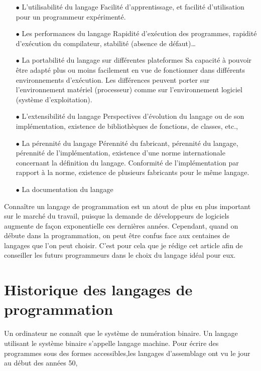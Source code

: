 \documentclass[a4paper,12pt]{article} %
\begin{document}
\begin{itemize}
\item[$\bullet$]L’utilisabilité du langage
Facilité d'apprentissage, et facilité d'utilisation pour un programmeur expérimenté.
\item[$\bullet$]Les performances du langage
Rapidité d'exécution des programmes, rapidité d'exécution du compilateur,  stabilité (absence de défaut)…
\item[$\bullet$]La portabilité du langage sur différentes plateformes
Sa capacité à pouvoir être adapté plus ou moins facilement en vue de fonctionner dans différents environnements d'exécution. Les différences peuvent porter sur l'environnement matériel (processeur) comme sur l'environnement logiciel (système d'exploitation).
\item[$\bullet$]L’extensibilité du langage
Perspectives d'évolution du langage ou de son implémentation, existence de bibliothèques de fonctions, de classes, etc.,
\item[$\bullet$]La pérennité du langage
Pérennité du fabricant, pérennité du langage, pérennité de l'implémentation, existence d'une norme internationale concernant la définition du langage. Conformité de l'implémentation par rapport à la norme, existence de plusieurs fabricants pour le même langage.
\item[$\bullet$]La documentation du langage
\end{itemize}
Connaître un langage de programmation est un atout de plus en plus important sur le marché du travail, puisque la demande de développeurs de logiciels augmente de façon exponentielle ces dernières années.
Cependant, quand on débute dans la programmation, on peut être confus face aux centaines de langages que l’on peut choisir. C’est pour cela que je rédige cet article afin de conseiller les futurs programmeurs dans le choix du langage idéal pour eux.


\section{Historique des langages de programmation} %

Un ordinateur ne connaît que le système de numération binaire. Un langage utilisant le système binaire s'appelle langage machine.
Pour écrire des programmes sous des formes accessibles,les langages d'assemblage ont vu le jour au début des années 50, 
 
\end{document}
